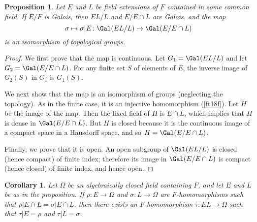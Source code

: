 \documentclass[a4paper,11pt,final,openany]{memoir}
\newtheorem{corollary}[X]{Corollary}
\newtheorem{proposition}[X]{Proposition}
\theoremstyle{nonumberplain}
\newtheorem{proof}{Proof.}
\begin{document}
\begin{proposition}
\label{ig8}Let $E$ and $L$ be field extensions of $F$ contained in some common
field. If $E/F$ is Galois, then $EL/L$ and $E/E\cap L$ are Galois, and the map%
\[
\sigma\mapsto\sigma|E\colon\Gal(EL/L)\rightarrow\Gal(E/E\cap L)
\]
is an isomorphism of topological groups.
\end{proposition}

\begin{minipage}{1.5in}
\end{minipage}


\begin{proof}
We first prove that the map is continuous. Let $G_{1}=\Gal(EL/L)$ and let
$G_{2}=\Gal(E/E\cap L)$. For any finite set $S$ of elements of $E$, the
inverse image of $G_{2}(S)$ in $G_{1}$ is $G_{1}(S)$.

We next show that the map is an isomorphism of groups (neglecting the
topology). As in the finite case, it is an injective homomorphism
(\ref{ft18f}). Let $H$ be the image of the map. Then the fixed field of $H$ is
$E\cap L$, which implies that $H$ is dense in $\Gal(E/E\cap L)$. But $H$ is
closed because it is the continuous image of a compact space in a Hausdorff
space, and so $H=\Gal(E/E\cap L)$.

Finally, we prove that it is open. An open subgroup of $\Gal(EL/L)$ is closed
(hence compact) of finite index; therefore its image in $\Gal(E/E\cap L)$ is
compact (hence closed) of finite index, and hence open.
\end{proof}

\begin{corollary}
\label{ig9}Let $\Omega$ be an algebraically closed field containing $F$, and
let $E$ and $L$ be as in the proposition. If $\rho\colon E\rightarrow\Omega$
and $\sigma\colon L\rightarrow\Omega$ are $F$-homomorphisms such that
$\rho|E\cap L=\sigma|E\cap L$, then there exists an $F$-homomorphism
$\tau\colon EL\rightarrow\Omega$ such that $\tau|E=\rho$ and $\tau|L=\sigma$.
\end{corollary}
\end{document}
